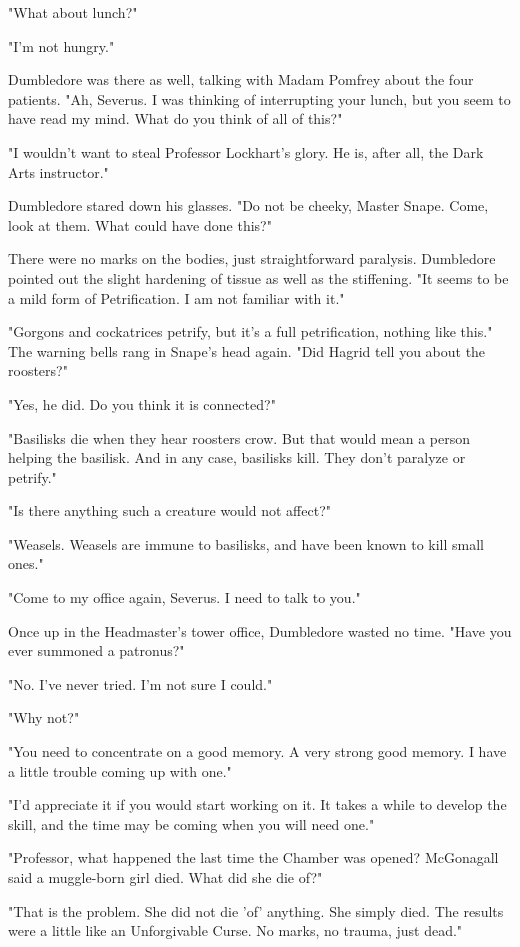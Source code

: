 \documentclass[a4paper,11pt]{article}
\begin{document}
"What about lunch?"

"I'm not hungry."

Dumbledore was there as well, talking with Madam Pomfrey about the four patients. "Ah, Severus. I was thinking of interrupting your lunch, but you seem to have read my mind. What do you think of all of this?"

"I wouldn't want to steal Professor Lockhart's glory. He is, after all, the Dark Arts instructor."

Dumbledore stared down his glasses. "Do not be cheeky, Master Snape. Come, look at them. What could have done this?"

There were no marks on the bodies, just straightforward paralysis. Dumbledore pointed out the slight hardening of tissue as well as the stiffening. "It seems to be a mild form of Petrification. I am not familiar with it."

"Gorgons and cockatrices petrify, but it's a full petrification, nothing like this." The warning bells rang in Snape's head again. "Did Hagrid tell you about the roosters?"

"Yes, he did. Do you think it is connected?"

"Basilisks die when they hear roosters crow. But that would mean a person helping the basilisk. And in any case, basilisks kill. They don't paralyze or petrify."

"Is there anything such a creature would not affect?"

"Weasels. Weasels are immune to basilisks, and have been known to kill small ones."

"Come to my office again, Severus. I need to talk to you."

Once up in the Headmaster's tower office, Dumbledore wasted no time. "Have you ever summoned a patronus?"

"No. I've never tried. I'm not sure I could."

"Why not?"

"You need to concentrate on a good memory. A very strong good memory. I have a little trouble coming up with one."

"I'd appreciate it if you would start working on it. It takes a while to develop the skill, and the time may be coming when you will need one."

"Professor, what happened the last time the Chamber was opened? McGonagall said a muggle-born girl died. What did she die of?"

"That is the problem. She did not die 'of' anything. She simply died. The results were a little like an Unforgivable Curse. No marks, no trauma, just dead."
\end{document}

